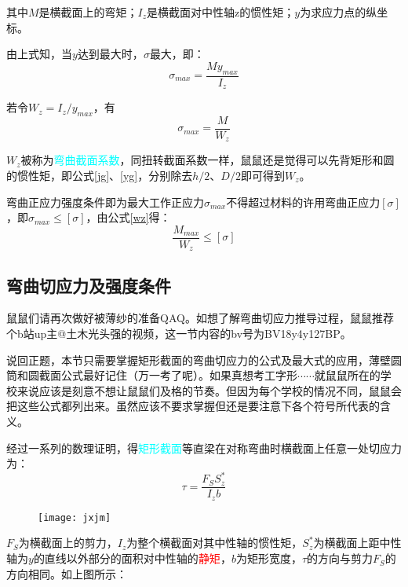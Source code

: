 \documentclass[10pt,a4paper]{ctexart}
\begin{document}
其中$M$是横截面上的弯矩；$I_z$是横截面对中性轴z的惯性矩；$y$为求应力点的纵坐标。

由上式知，当$y$达到最大时，$\sigma$最大，即：
\begin{equation}
	\sigma_{max}=\frac{My_{max}}{I_z}
\end{equation}

若令$W_z=I_z/y_{max}$，有
\begin{equation}
	\sigma_{max}=\frac{M}{W_z}
\label{wz}
\end{equation}

$W_z$被称为\textcolor{cyan}{弯曲截面系数}，同扭转截面系数一样，鼠鼠还是觉得可以先背矩形和圆的惯性矩，即公式\ref{jg}、\ref{yg}，分别除去$h/2$、$D/2$即可得到$W_z$。

弯曲正应力强度条件即为最大工作正应力$\sigma_{max}$不得超过材料的许用弯曲正应力$\left[\sigma\right]$，即$\sigma_{max}\leqslant\left[\sigma\right] $，由公式\ref{wz}得：
\begin{equation}
       \frac{M_{max}}{W_z}\leqslant\left[\sigma\right]
\end{equation}

\subsection{弯曲切应力及强度条件}
鼠鼠们请再次做好被薄纱的准备QAQ。如想了解弯曲切应力推导过程，鼠鼠推荐个b站up主@土木光头强的视频，这一节内容的bv号为BV18y4y127BP。

说回正题，本节只需要掌握矩形截面的弯曲切应力的公式及最大式的应用，薄壁圆筒和圆截面公式最好记住（万一考了呢）。如果真想考工字形$\cdots \cdots$就鼠鼠所在的学校来说应该是刻意不想让鼠鼠们及格的节奏。但因为每个学校的情况不同，鼠鼠会把这些公式都列出来。虽然应该不要求掌握但还是要注意下各个符号所代表的含义。

经过一系列的数理证明，得\textcolor{cyan}{矩形截面}等直梁在对称弯曲时横截面上任意一处切应力为：
\begin{equation}
	\tau=\frac{F_SS^{\ast}_z}{I_zb}
\end{equation}

\begin{figure}[htp]%
	\centering
	\texttt{[image: jxjm]}
\end{figure}

$F_S$为横截面上的剪力，$I_z$为整个横截面对其中性轴的惯性矩，$S^{\ast}_z$为横截面上距中性轴为$y$的直线以外部分的面积对中性轴的\textcolor{red}{静矩}，$b$为矩形宽度，$\tau$的方向与剪力$F_S$的方向相同。如上图所示：
\end{document}
